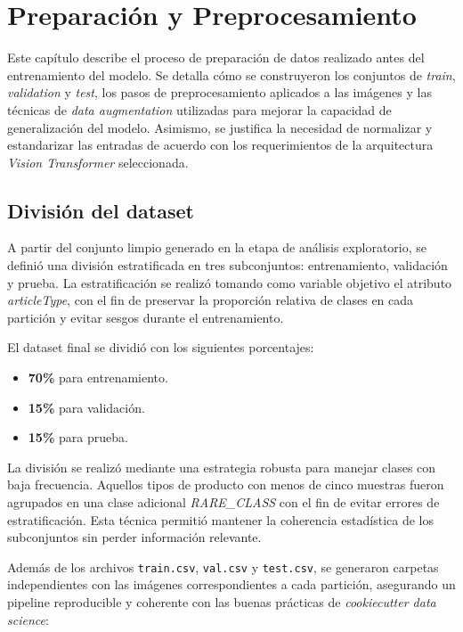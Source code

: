 \chapter{Preparación y Preprocesamiento}
\label{Chapter3}

Este capítulo describe el proceso de preparación de datos realizado antes del entrenamiento del modelo. Se detalla cómo se construyeron los conjuntos de \textit{train}, \textit{validation} y \textit{test}, los pasos de preprocesamiento aplicados a las imágenes y las técnicas de \textit{data augmentation} utilizadas para mejorar la capacidad de generalización del modelo. Asimismo, se justifica la necesidad de normalizar y estandarizar las entradas de acuerdo con los requerimientos de la arquitectura \textit{Vision Transformer} seleccionada.

\section{División del dataset}

A partir del conjunto limpio generado en la etapa de análisis exploratorio, se definió una división estratificada en tres subconjuntos: entrenamiento, validación y prueba. La estratificación se realizó tomando como variable objetivo el atributo \textit{articleType}, con el fin de preservar la proporción relativa de clases en cada partición y evitar sesgos durante el entrenamiento.

El dataset final se dividió con los siguientes porcentajes:

\begin{itemize}
    \item \textbf{70\%} para entrenamiento.
    \item \textbf{15\%} para validación.
    \item \textbf{15\%} para prueba.
\end{itemize}

La división se realizó mediante una estrategia robusta para manejar clases con baja frecuencia. Aquellos tipos de producto con menos de cinco muestras fueron agrupados en una clase adicional \textit{RARE\_CLASS} con el fin de evitar errores de estratificación. Esta técnica permitió mantener la coherencia estadística de los subconjuntos sin perder información relevante.

Además de los archivos \texttt{train.csv}, \texttt{val.csv} y \texttt{test.csv}, se generaron carpetas independientes con las imágenes correspondientes a cada partición, asegurando un pipeline reproducible y coherente con las buenas prácticas de \textit{cookiecutter data science}:

